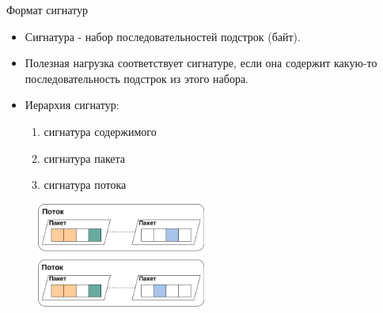 \documentclass[10pt]{beamer}
\begin{document}
\begin{frame}{Формат сигнатур}
    \begin{itemize}
        \item Сигнатура - набор последовательностей подстрок (байт).
        \item Полезная нагрузка соответствует
        сигнатуре, если она содержит какую-то последовательность подстрок из этого набора.
        \item Иерархия сигнатур:
        \begin{enumerate}
            \item сигнатура содержимого
            \item сигнатура пакета
            \item сигнатура потока
        \end{enumerate}
    \end{itemize}

    \begin{figure}
        \begin{adjustwidth}{-2em}{-2em}
            \centering
            \includegraphics[width=15em]{../images/signature_structure_v2.png}
        \end{adjustwidth}
    \end{figure}

\end{frame}
\end{document}
